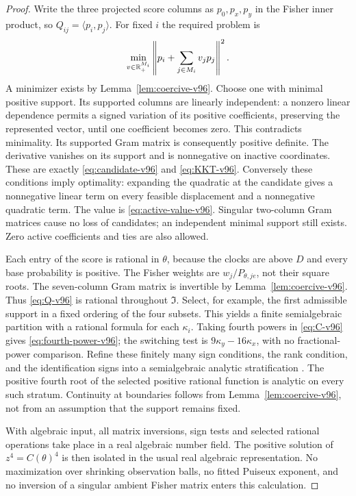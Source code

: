 \begin{proof}
Write the three projected score columns as $p_0,p_x,p_y$ in the
Fisher inner product, so $Q_{ij}=\langle p_i,p_j\rangle$.
For fixed $i$ the required problem is
\[
 \min_{v\in\mathbb R_+^{M_i}}
       \left\|p_i+\sum_{j\in M_i}v_jp_j\right\|^2.
\]
A minimizer exists by Lemma~\ref{lem:coercive-v96}. Choose one with
minimal positive support. Its supported columns are linearly
independent: a nonzero linear dependence permits a signed variation
of its positive coefficients, preserving the represented vector,
until one coefficient becomes zero. This contradicts minimality.
Its supported Gram matrix is consequently positive definite.
The derivative vanishes on its support and is nonnegative on inactive
coordinates. These are exactly \eqref{eq:candidate-v96} and
\eqref{eq:KKT-v96}. Conversely these conditions imply optimality:
expanding the quadratic at the candidate gives a nonnegative linear
term on every feasible displacement and a nonnegative quadratic term.
The value is \eqref{eq:active-value-v96}. Singular two-column Gram
matrices cause no loss of candidates; an independent minimal support
still exists. Zero active coefficients and ties are also allowed.

Each entry of the score is rational in $\theta$, because the clocks
are above $D$ and every base probability is positive. The Fisher
weights are $w_j/P_{\theta,je}$, not their square roots. The seven-column
Gram matrix is invertible by Lemma~\ref{lem:coercive-v96}. Thus
\eqref{eq:Q-v96} is rational throughout $\mathfrak I$. Select, for
example, the first admissible support in a fixed ordering of the four
subsets. This yields a finite semialgebraic partition with a rational
formula for each $\kappa_i$. Taking fourth powers in
\eqref{eq:C-v96} gives \eqref{eq:fourth-power-v96}; the switching test
is $9\kappa_y-16\kappa_x$, with no fractional-power comparison.
Refine these finitely many sign conditions, the rank condition, and
the identification signs into a semialgebraic analytic stratification
\cite{BCR98}. The positive fourth root of the selected positive
rational function is analytic on every such stratum. Continuity at
boundaries follows from Lemma~\ref{lem:coercive-v96}, not from an
assumption that the support remains fixed.

With algebraic input, all matrix inversions, sign tests and selected
rational operations take place in a real algebraic number field.
The positive solution of $z^4=C(\theta)^4$ is then isolated in the
usual real algebraic representation. No maximization over shrinking
observation balls, no fitted Puiseux exponent, and no inversion of a
singular ambient Fisher matrix enters this calculation.
\end{proof}

